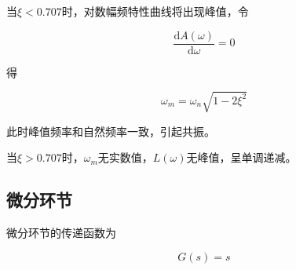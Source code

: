 \documentclass[lang=cn,10pt]{elegantbook}
\begin{document}
当$\xi<0.707$时，对数幅频特性曲线将出现峰值，令

\begin{equation}
	\frac{\mathrm{d}A(\omega)}{\mathrm{d}\omega}=0
\end{equation}

得

\begin{equation}
	\omega_m=\omega_n\sqrt{1-2\xi^2}
\end{equation}

此时峰值频率和自然频率一致，引起共振。

当$\xi>0.707$时，$\omega_m$无实数值，$L(\omega)$无峰值，呈单调递减。

\subsection{微分环节}

微分环节的传递函数为

\begin{equation}
	G(s)=s
\end{equation}
\end{document}
